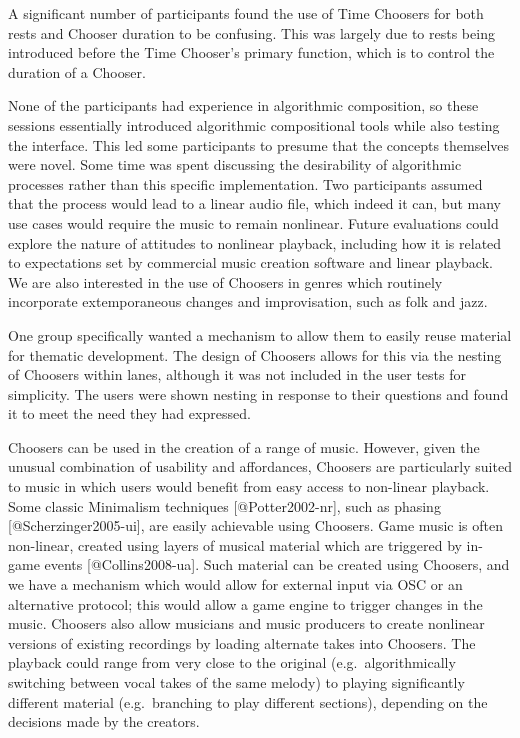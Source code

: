 \documentclass[]{article}
\begin{document}
A significant number of participants found the use of Time Choosers for
both rests and Chooser duration to be confusing. This was largely due to
rests being introduced before the Time Chooser's primary function, which
is to control the duration of a Chooser.

None of the participants had experience in algorithmic composition, so
these sessions essentially introduced algorithmic compositional tools
while also testing the interface. This led some participants to presume
that the concepts themselves were novel. Some time was spent discussing
the desirability of algorithmic processes rather than this specific
implementation. Two participants assumed that the process would lead to
a linear audio file, which indeed it can, but many use cases would
require the music to remain nonlinear. Future evaluations could explore
the nature of attitudes to nonlinear playback, including how it is
related to expectations set by commercial music creation software and
linear playback. We are also interested in the use of Choosers in genres
which routinely incorporate extemporaneous changes and improvisation,
such as folk and jazz.

One group specifically wanted a mechanism to allow them to easily reuse
material for thematic development. The design of Choosers allows for
this via the nesting of Choosers within lanes, although it was not
included in the user tests for simplicity. The users were shown nesting
in response to their questions and found it to meet the need they had
expressed.

Choosers can be used in the creation of a range of music. However, given
the unusual combination of usability and affordances, Choosers are
particularly suited to music in which users would benefit from easy
access to non-linear playback. Some classic Minimalism techniques
{[}@Potter2002-nr{]}, such as phasing {[}@Scherzinger2005-ui{]}, are
easily achievable using Choosers. Game music is often non-linear,
created using layers of musical material which are triggered by in-game
events {[}@Collins2008-ua{]}. Such material can be created using
Choosers, and we have a mechanism which would allow for external input
via OSC or an alternative protocol; this would allow a game engine to
trigger changes in the music. Choosers also allow musicians and music
producers to create nonlinear versions of existing recordings by loading
alternate takes into Choosers. The playback could range from very close
to the original (e.g.~algorithmically switching between vocal takes of
the same melody) to playing significantly different material
(e.g.~branching to play different sections), depending on the decisions
made by the creators.
\end{document}
